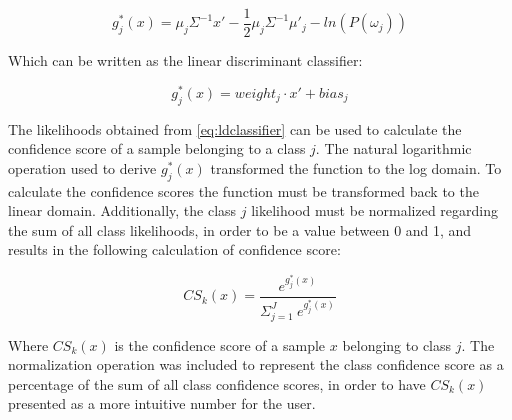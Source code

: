\begin{equation} 
	g_{j}^{*}(x) = \mu_{j}\varSigma^{-1}x' - \frac{1}{2}\mu_{j}\varSigma^{-1}\mu'_{j} - ln(P(\omega_{j}))
\end{equation}

Which can be written as the linear discriminant classifier:

\begin{equation} \label{eq:ldclassifier}
	g_{j}^{*}(x) = weight_{j}\cdot x' + bias_{j}
\end{equation}

The likelihoods obtained from \eqref{eq:ldclassifier} can be used to calculate the confidence score of a sample belonging to a class $j$. The natural logarithmic operation used to derive $g_{j}^{*}(x)$ transformed the function to the log domain. To calculate the confidence scores the function must be transformed back to the linear domain. Additionally, the class $j$ likelihood must be normalized regarding the sum of all class likelihoods, in order to be a value between 0 and 1, and results in the following calculation of confidence score:

\begin{equation}
	CS_{k}(x) = \frac{e^{g^{*}_{j}(x)}}{\Sigma^{J}_{j=1}~e^{g^{*}_{j}(x)}}
\end{equation}

Where $CS_{k}(x)$ is the confidence score of a sample $x$ belonging to class $j$. The normalization operation was included to represent the class confidence score as a percentage of the sum of all class confidence scores, in order to have $CS_{k}(x)$ presented as a more intuitive number for the user.

